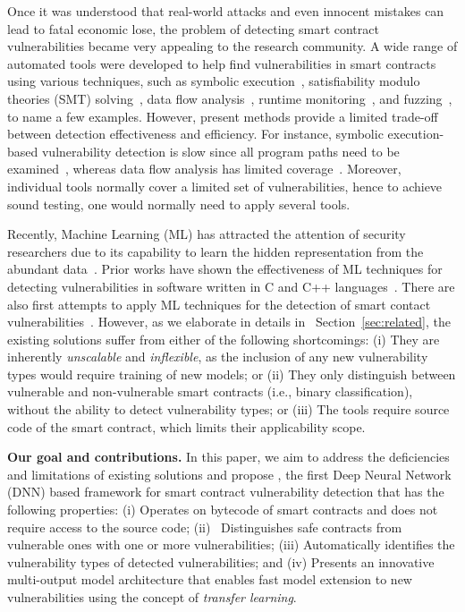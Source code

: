 Once it was understood that real-world attacks and even innocent mistakes can lead to fatal economic lose, the problem of detecting smart contract vulnerabilities became very appealing to the research community. 
A wide range of automated tools were developed to help find vulnerabilities in smart contracts using various techniques, such as symbolic execution~\cite{rw_securify_paper,ethereum-background-03}, satisfiability modulo theories (SMT) solving~\cite{alt2018smt}, data flow analysis~\cite{feist2019slither}, runtime monitoring~\cite{cook2017dappguard}, and fuzzing~\cite{fu2019evmfuzzer}, to name a few examples.
However, present methods provide a limited trade-off between detection effectiveness and efficiency. 
For instance, symbolic execution-based vulnerability detection is slow since all program paths need to be examined~\cite{rw_oyente_repo}, whereas data flow analysis has limited coverage~\cite{feist2019slither}. Moreover, individual tools normally cover a limited set of vulnerabilities, hence to achieve sound testing, one would normally need to apply several tools. 

Recently, Machine Learning (ML) has attracted the attention of security researchers due to its capability to learn the hidden representation from the abundant data~\cite{alpaydin2020introduction}. 
Prior works have shown the effectiveness of ML techniques for detecting vulnerabilities in software written in C and C++ languages~\cite{russell2018automated,vytovtov21prediction}. 
There are also first attempts to apply ML techniques for the detection of smart contact vulnerabilities~\cite{rw_contractward,rw_lstm,huang2018hunting}. 
However, as we elaborate in details in~ Section~\ref{sec:related}, the existing solutions suffer from either of the following shortcomings: (i) They are inherently \textit{unscalable} and \textit{inflexible}, as the inclusion of any new vulnerability types would require training of new models; or (ii) They only distinguish between vulnerable and non-vulnerable smart contracts (i.e., binary classification), without the ability to detect vulnerability types; or (iii) The tools require source code of the smart contract, which limits their applicability scope.

\vspace{0.1em}
\noindent\textbf{Our goal and contributions.} In this paper, we aim to address the deficiencies and limitations of existing solutions and propose \sys{}, the first Deep Neural Network (DNN) based framework for smart contract vulnerability detection that has the following properties: (i) Operates on bytecode of smart contracts and does not require access to the source code; (ii)~ Distinguishes safe contracts from vulnerable ones with one or more vulnerabilities; 
(iii) Automatically identifies the vulnerability types of detected vulnerabilities; and 
(iv) Presents an innovative multi-output model architecture that enables fast model extension to new vulnerabilities 
using the concept of \textit{transfer learning}. 

